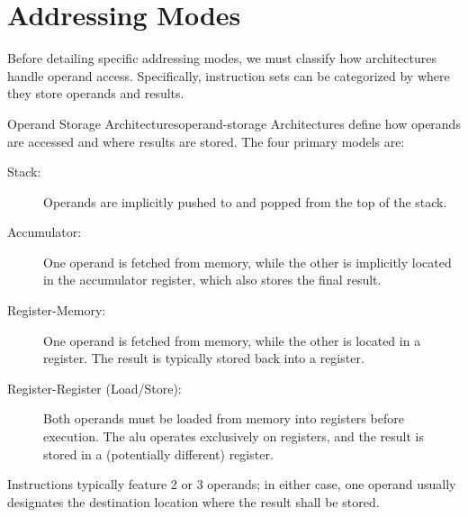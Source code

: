 \section{Addressing Modes}
Before detailing specific addressing modes, we must classify how architectures handle operand access. Specifically, instruction sets can be categorized by where they store operands and results.

\begin{concept}{Operand Storage Architectures}{operand-storage}
    Architectures define how operands are accessed and where results are stored. The four primary models are:
    \begin{description}
        \item[Stack:] Operands are implicitly pushed to and popped from the top of the stack.
        \item[Accumulator:] One operand is fetched from memory, while the other is implicitly located in the accumulator register, which also stores the final result.
        \item[Register-Memory:] One operand is fetched from memory, while the other is located in a register. The result is typically stored back into a register.
        \item[Register-Register (Load/Store):] Both operands must be loaded from memory into registers before execution. The \gls{alu} operates exclusively on registers, and the result is stored in a (potentially different) register.
    \end{description}
\end{concept}

\noindent Instructions typically feature 2 or 3 operands; in either case, one operand usually designates the destination location where the result shall be stored.

